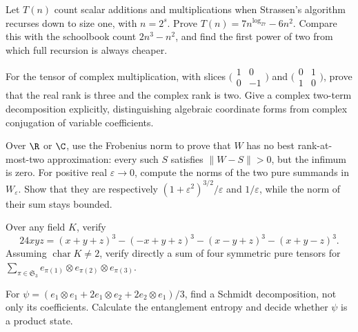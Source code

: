 \begin{exercise}[$\star\star$]\label{linear:ex:strassencount}
Let $T(n)$ count scalar additions and multiplications when Strassen's algorithm recurses down to size one, with $n=2^s$. Prove
$T(n)=7n^{\log_27}-6n^2$. Compare this with the schoolbook count $2n^3-n^2$, and find the first power of two from which full recursion is always cheaper.
\end{exercise}

\begin{exercise}[$\star\star$]\label{linear:ex:complexmult}
For the tensor of complex multiplication, with slices
$\bigl(\begin{smallmatrix}1&0\\0&-1\end{smallmatrix}\bigr)$ and
$\bigl(\begin{smallmatrix}0&1\\1&0\end{smallmatrix}\bigr)$, prove that the real rank is three and the complex rank is two. Give a complex two-term decomposition explicitly, distinguishing algebraic coordinate forms from complex conjugation of variable coefficients.
\end{exercise}

\begin{exercise}[$\star$]\label{linear:ex:noapprox}
Over $\R$ or $\C$, use the Frobenius norm to prove that $W$ has no best rank-at-most-two approximation: every such $S$ satisfies $\|W-S\|>0$, but the infimum is zero. For positive real $\varepsilon\to0$, compute the norms of the two pure summands in $W_\varepsilon$. Show that they are respectively $(1+\varepsilon^2)^{3/2}/\varepsilon$ and $1/\varepsilon$, while the norm of their sum stays bounded.
\end{exercise}

\begin{exercise}[$\star\star$]\label{linear:ex:waring}
Over any field $K$, verify
\[
24xyz=(x+y+z)^3-(-x+y+z)^3-(x-y+z)^3-(x+y-z)^3.
\]
Assuming $\operatorname{char}K\ne2$, verify directly a sum of four symmetric pure tensors for
$\sum_{\pi\in\mathfrak S_3}e_{\pi(1)}\otimes e_{\pi(2)}\otimes e_{\pi(3)}$.
\end{exercise}

\begin{exercise}[$\star$]\label{linear:ex:schmidtcheck}
For $\psi=(e_1\otimes e_1+2e_1\otimes e_2+2e_2\otimes e_1)/3$, find a Schmidt decomposition, not only its coefficients. Calculate the entanglement entropy and decide whether $\psi$ is a product state.
\end{exercise}

